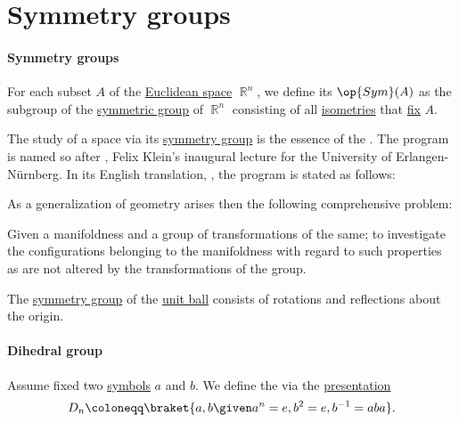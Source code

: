 \section{Symmetry groups}\label{sec:symmetry_groups}

\paragraph{Symmetry groups}

\begin{definition}\label{def:symmetry_group}
  For each subset \( A \) of the \hyperref[def:euclidean_space]{Euclidean space} \( \BbbR^n \), we define its  \( \op{Sym}(A) \) as the subgroup of the \hyperref[def:symmetric_group]{symmetric group} of \( \BbbR^n \) consisting of all \hyperref[def:isometry]{isometries} that \hyperref[def:fixed_point]{fix} \( A \).
\end{definition}

\begin{remark}\label{rem:erlangen_program}
  The study of a space via its \hyperref[def:symmetry_group]{symmetry group} is the essence of the . The program is named so after \cite{Klein1893ErlangenProgram}, Felix Klein's inaugural lecture for the University of Erlangen-N\"urnberg. In its English translation, \cite[218]{Klein1893ErlangenProgramEnglish}, the program is stated as follows:
  \begin{displayquote}
    As a generalization of geometry arises then the following comprehensive problem:
    \begin{displayquote}
      Given a manifoldness and a group of transformations of the same; to investigate the configurations belonging to the manifoldness with regard to such properties as are not altered by the transformations of the group.
    \end{displayquote}
  \end{displayquote}
\end{remark}

\begin{proposition}\label{thm:symmetry_group_of_sphere}
  The \hyperref[def:symmetry_group]{symmetry group} of the \hyperref[def:metric_space/ball]{unit ball} consists of rotations and reflections about the origin.
\end{proposition}

\paragraph{Dihedral group}

\begin{definition}\label{def:dihedral_group}
  Assume fixed two \hyperref[def:formal_language/symbol]{symbols} \( a \) and \( b \). We define the  via the \hyperref[def:group_presentation]{presentation}
  \begin{equation}\label{eq:def:dihedral_group}
    D_n \coloneqq \braket{ a, b \given a^n = e, b^2 = e, b^{-1} = aba }.
  \end{equation}
\end{definition}
